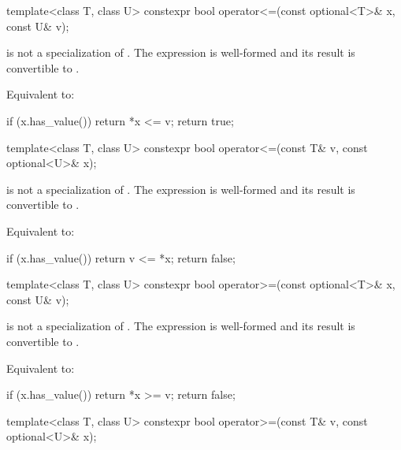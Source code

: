%
\begin{itemdecl}
template<class T, class U>
  constexpr bool operator<=(const optional<T>& x, const U& v);
\end{itemdecl}

\begin{itemdescr}
\pnum
\constraints
{} is not a specialization of . The expression  is well-formed and its result is convertible to .

\pnum
\effects
Equivalent to:
\begin{codeblock}
if (x.has_value())
  return *x <= v;
return true;
\end{codeblock}
\end{itemdescr}

%
\begin{itemdecl}
template<class T, class U>
  constexpr bool operator<=(const T& v, const optional<U>& x);
\end{itemdecl}

\begin{itemdescr}
\pnum
\constraints
{} is not a specialization of . The expression  is well-formed and its result is convertible to .

\pnum
\effects
Equivalent to:
\begin{codeblock}
if (x.has_value())
  return v <= *x;
return false;
\end{codeblock}
\end{itemdescr}

%
\begin{itemdecl}
template<class T, class U>
  constexpr bool operator>=(const optional<T>& x, const U& v);
\end{itemdecl}

\begin{itemdescr}
\pnum
\constraints
{} is not a specialization of . The expression  is well-formed and its result is convertible to .

\pnum
\effects
Equivalent to:
\begin{codeblock}
if (x.has_value())
  return *x >= v;
return false;
\end{codeblock}
\end{itemdescr}

%
\begin{itemdecl}
template<class T, class U>
  constexpr bool operator>=(const T& v, const optional<U>& x);
\end{itemdecl}

